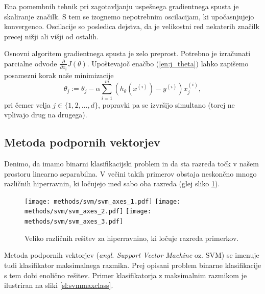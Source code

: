 \documentclass[11pt,a4paper,openany]{book}
\begin{document}
Ena pomembnih tehnik pri zagotavljanju uspešnega gradientnega spusta je skaliranje značilk. S tem se izognemo nepotrebnim oscilacijam, ki upočasnjujejo konvergenco. Oscilacije so posledica dejstva, da je velikostni red nekaterih značilk precej nižji ali višji od ostalih.

Osnovni algoritem gradientnega spusta je zelo preprost. Potrebno je izračunati parcialne odvode $\frac{\partial}{\partial x_i}J(\theta)$. Upoštevajoč enačbo (\ref{en:j_theta}) lahko zapišemo posamezni korak naše minimizacije
\begin{equation}
	\theta_j := \theta_j - \alpha \sum^m_{i = 1}(h_\theta(x^{(i)}) - y^{(i)})x_j^{(i)},
	\label{en:log_reg_update}
\end{equation}  
pri čemer velja $j \in \{1, 2, \ldots, d\}$, popravki pa se izvršijo simultano (torej ne vplivajo drug na drugega).



\subsection{Metoda podpornih vektorjev}

Denimo, da imamo binarni klasifikacijski problem in da sta razreda točk v našem prostoru linearno separabilna. V večini takih primerov obstaja neskončno mnogo različnih hiperravnin, ki ločujejo med sabo oba razreda (glej sliko \ref{svmseparable}).

\begin{figure}[ht]
	\texttt{[image: methods/svm/svm\_axes\_1.pdf]}
	\texttt{[image: methods/svm/svm\_axes\_2.pdf]}
	\texttt{[image: methods/svm/svm\_axes\_3.pdf]}	
	
	\caption{Veliko različnih rešitev za hiperravnino, ki ločuje razreda primerkov.}
	\label{svmseparable}
\end{figure}

Metoda podpornih vektorjev (\textit{angl. Support Vector Machine} oz. SVM) se imenuje tudi klasifikator maksimalnega razmika. Prej opisani problem binarne klasifikacije s tem dobi enolično rešitev. Primer klasifikatorja z maksimalnim razmikom je ilustriran na sliki \ref{sl:svmmaxclass}.
\end{document}
